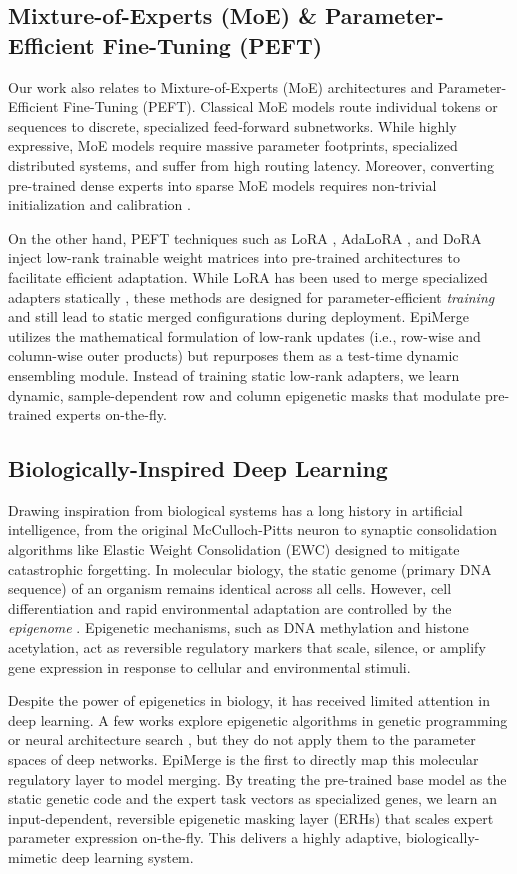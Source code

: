 \subsection{Mixture-of-Experts (MoE) \& Parameter-Efficient Fine-Tuning (PEFT)}
Our work also relates to Mixture-of-Experts (MoE) architectures and Parameter-Efficient Fine-Tuning (PEFT). 
Classical MoE models \cite{shazeer2017outrageously, fedus2022switch, gshard} route individual tokens or sequences to discrete, specialized feed-forward subnetworks. While highly expressive, MoE models require massive parameter footprints, specialized distributed systems, and suffer from high routing latency. Moreover, converting pre-trained dense experts into sparse MoE models requires non-trivial initialization and calibration \cite{moe_merging, merge_moe_layers}.

On the other hand, PEFT techniques such as LoRA \cite{lora}, AdaLoRA \cite{adalora}, and DoRA \cite{dora} inject low-rank trainable weight matrices into pre-trained architectures to facilitate efficient adaptation. While LoRA has been used to merge specialized adapters statically \cite{lora_hub, zip_loras}, these methods are designed for parameter-efficient \emph{training} and still lead to static merged configurations during deployment. EpiMerge utilizes the mathematical formulation of low-rank updates (i.e., row-wise and column-wise outer products) but repurposes them as a test-time dynamic ensembling module. Instead of training static low-rank adapters, we learn dynamic, sample-dependent row and column epigenetic masks that modulate pre-trained experts on-the-fly.

\subsection{Biologically-Inspired Deep Learning}
Drawing inspiration from biological systems has a long history in artificial intelligence, from the original McCulloch-Pitts neuron \cite{mcculloch_pitts} to synaptic consolidation algorithms like Elastic Weight Consolidation (EWC) \cite{ewc} designed to mitigate catastrophic forgetting.
In molecular biology, the static genome (primary DNA sequence) of an organism remains identical across all cells. However, cell differentiation and rapid environmental adaptation are controlled by the \emph{epigenome} \cite{epigenetics_textbook, chemical_genetics}. Epigenetic mechanisms, such as DNA methylation and histone acetylation, act as reversible regulatory markers that scale, silence, or amplify gene expression in response to cellular and environmental stimuli.

Despite the power of epigenetics in biology, it has received limited attention in deep learning. A few works explore epigenetic algorithms in genetic programming or neural architecture search \cite{epigenetic_gp}, but they do not apply them to the parameter spaces of deep networks. EpiMerge is the first to directly map this molecular regulatory layer to model merging. By treating the pre-trained base model as the static genetic code and the expert task vectors as specialized genes, we learn an input-dependent, reversible epigenetic masking layer (ERHs) that scales expert parameter expression on-the-fly. This delivers a highly adaptive, biologically-mimetic deep learning system.
